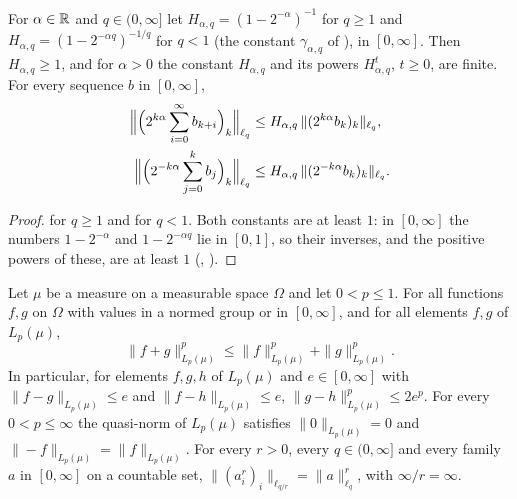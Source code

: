 \begin{lemma}
\label{lem:hardy-every-exponent}
\leanok
{}
For $\alpha \in \mathbb{R}$ and $q \in (0, \infty]$ let $H_{\alpha, q} = (1 - 2^{-\alpha})^{-1}$ for
$q \geq 1$ and $H_{\alpha, q} = (1 - 2^{-\alpha q})^{-1/q}$ for $q < 1$ (the constant
$\gamma_{\alpha, q}$ of ), in $[0, \infty]$. Then $H_{\alpha, q} \geq 1$,
and for $\alpha > 0$ the constant $H_{\alpha, q}$ and its powers $H_{\alpha, q}^t$, $t \geq 0$,
are finite. For every sequence $b$
in $[0, \infty]$,
\begin{align*}
  \Bigl\| \Bigl(2^{k\alpha} \sum_{i=0}^\infty b_{k+i}\Bigr)_k \Bigr\|_{\ell_q}
  &\leq H_{\alpha, q} \, \|(2^{k\alpha} b_k)_k\|_{\ell_q} , \\
  \Bigl\| \Bigl(2^{-k\alpha} \sum_{j=0}^{k} b_j\Bigr)_k \Bigr\|_{\ell_q}
  &\leq H_{\alpha, q} \, \|(2^{-k\alpha} b_k)_k\|_{\ell_q} .
\end{align*}
\end{lemma}

\begin{proof}
\leanok
{}
 for $q \geq 1$ and  for $q < 1$. Both constants are
at least $1$: in $[0, \infty]$ the numbers $1 - 2^{-\alpha}$ and $1 - 2^{-\alpha q}$ lie in
$[0, 1]$, so their inverses, and the positive powers of these, are at least $1$
(, ).
\end{proof}

\begin{lemma}
\label{lem:lp-rho-triangle}
\leanok
{}
Let $\mu$ be a measure on a measurable space $\Omega$ and let $0 < p \leq 1$. For all functions
$f, g$ on $\Omega$ with values in a normed group or in $[0, \infty]$, and for all elements $f, g$
of $L_p(\mu)$,
\[
  \|f + g\|_{L_p(\mu)}^p \leq \|f\|_{L_p(\mu)}^p + \|g\|_{L_p(\mu)}^p .
\]
In particular, for elements $f, g, h$ of $L_p(\mu)$ and $e \in [0, \infty]$ with
$\|f - g\|_{L_p(\mu)} \leq e$ and $\|f - h\|_{L_p(\mu)} \leq e$,
$\|g - h\|_{L_p(\mu)}^p \leq 2 e^p$. For every $0 < p \leq \infty$ the quasi-norm of $L_p(\mu)$
satisfies $\|0\|_{L_p(\mu)} = 0$ and
$\|-f\|_{L_p(\mu)} = \|f\|_{L_p(\mu)}$. For every $r > 0$, every $q \in (0, \infty]$ and every
family $a$ in $[0, \infty]$ on a countable set, $\|(a_i^r)_i\|_{\ell_{q/r}} = \|a\|_{\ell_q}^r$,
with $\infty / r = \infty$.
\end{lemma}

